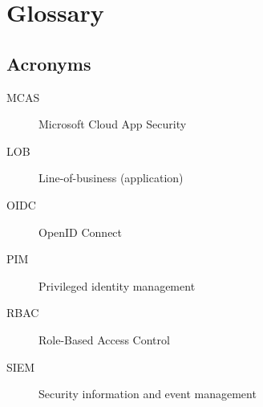\section{Glossary}
\subsection{Acronyms}
\begin{description}
	\item[MCAS] Microsoft Cloud App Security
	\item[LOB] Line-of-business (application)
	\item[OIDC] OpenID Connect
	\item[PIM] Privileged identity management
	\item[RBAC] Role-Based Access Control 
	\item[SIEM] Security information and event management
\end{description}

